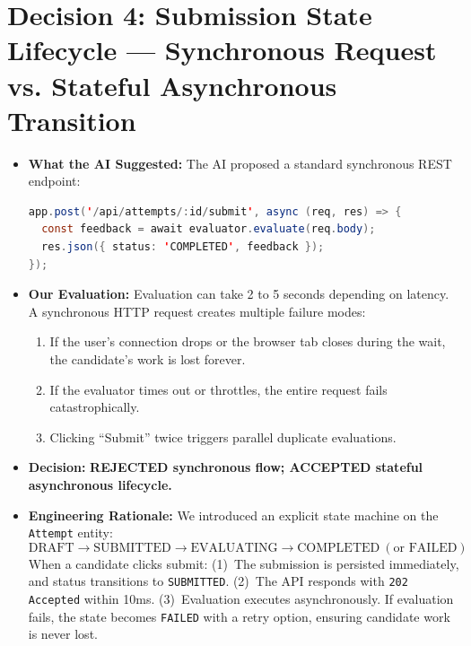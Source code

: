 \documentclass[10pt,a4paper]{article}
\begin{document}
\section*{Decision 4: Submission State Lifecycle --- Synchronous Request vs. Stateful Asynchronous Transition}
\begin{itemize}
  \item \textbf{What the AI Suggested:} The AI proposed a standard synchronous REST endpoint:
\begin{lstlisting}[language=java]
app.post('/api/attempts/:id/submit', async (req, res) => {
  const feedback = await evaluator.evaluate(req.body);
  res.json({ status: 'COMPLETED', feedback });
});
\end{lstlisting}
  \item \textbf{Our Evaluation:} Evaluation can take 2 to 5 seconds depending on latency. A synchronous HTTP request creates multiple failure modes:
    \begin{enumerate}
      \item If the user's connection drops or the browser tab closes during the wait, the candidate's work is lost forever.
      \item If the evaluator times out or throttles, the entire request fails catastrophically.
      \item Clicking ``Submit'' twice triggers parallel duplicate evaluations.
    \end{enumerate}
  \item \textbf{Decision:} \textbf{REJECTED synchronous flow; ACCEPTED stateful asynchronous lifecycle.}
  \item \textbf{Engineering Rationale:} We introduced an explicit state machine on the \texttt{Attempt} entity:
  $$\text{DRAFT} \longrightarrow \text{SUBMITTED} \longrightarrow \text{EVALUATING} \longrightarrow \text{COMPLETED} \ (\text{or } \text{FAILED})$$
  When a candidate clicks submit:
  (1)~The submission is persisted immediately, and status transitions to \texttt{SUBMITTED}.
  (2)~The API responds with \texttt{202 Accepted} within 10ms.
  (3)~Evaluation executes asynchronously. If evaluation fails, the state becomes \texttt{FAILED} with a retry option, ensuring candidate work is never lost.
\end{itemize}
\end{document}
